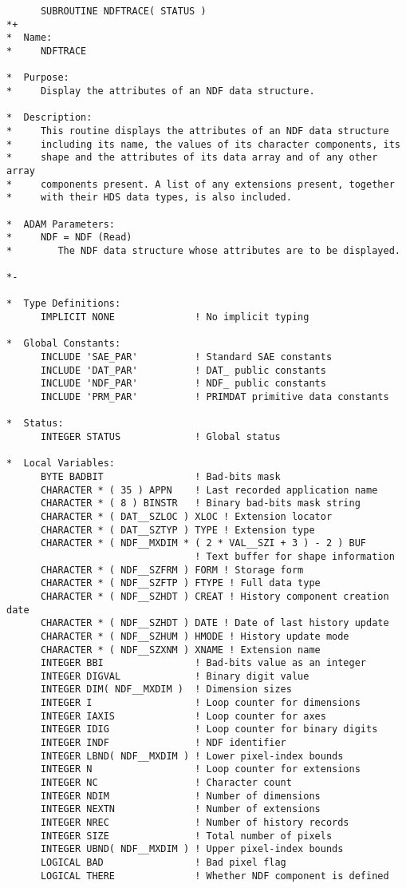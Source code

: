 \documentclass[twoside,11pt]{article}
\begin{document}
\small
\begin{verbatim}
      SUBROUTINE NDFTRACE( STATUS )
*+
*  Name:
*     NDFTRACE

*  Purpose:
*     Display the attributes of an NDF data structure.

*  Description:
*     This routine displays the attributes of an NDF data structure
*     including its name, the values of its character components, its
*     shape and the attributes of its data array and of any other array
*     components present. A list of any extensions present, together
*     with their HDS data types, is also included.

*  ADAM Parameters:
*     NDF = NDF (Read)
*        The NDF data structure whose attributes are to be displayed.

*-
      
*  Type Definitions:
      IMPLICIT NONE              ! No implicit typing

*  Global Constants:
      INCLUDE 'SAE_PAR'          ! Standard SAE constants
      INCLUDE 'DAT_PAR'          ! DAT_ public constants
      INCLUDE 'NDF_PAR'          ! NDF_ public constants
      INCLUDE 'PRM_PAR'          ! PRIMDAT primitive data constants

*  Status:
      INTEGER STATUS             ! Global status

*  Local Variables:
      BYTE BADBIT                ! Bad-bits mask
      CHARACTER * ( 35 ) APPN    ! Last recorded application name
      CHARACTER * ( 8 ) BINSTR   ! Binary bad-bits mask string
      CHARACTER * ( DAT__SZLOC ) XLOC ! Extension locator
      CHARACTER * ( DAT__SZTYP ) TYPE ! Extension type
      CHARACTER * ( NDF__MXDIM * ( 2 * VAL__SZI + 3 ) - 2 ) BUF
                                 ! Text buffer for shape information
      CHARACTER * ( NDF__SZFRM ) FORM ! Storage form
      CHARACTER * ( NDF__SZFTP ) FTYPE ! Full data type
      CHARACTER * ( NDF__SZHDT ) CREAT ! History component creation date
      CHARACTER * ( NDF__SZHDT ) DATE ! Date of last history update
      CHARACTER * ( NDF__SZHUM ) HMODE ! History update mode
      CHARACTER * ( NDF__SZXNM ) XNAME ! Extension name
      INTEGER BBI                ! Bad-bits value as an integer
      INTEGER DIGVAL             ! Binary digit value
      INTEGER DIM( NDF__MXDIM )  ! Dimension sizes
      INTEGER I                  ! Loop counter for dimensions
      INTEGER IAXIS              ! Loop counter for axes
      INTEGER IDIG               ! Loop counter for binary digits
      INTEGER INDF               ! NDF identifier
      INTEGER LBND( NDF__MXDIM ) ! Lower pixel-index bounds
      INTEGER N                  ! Loop counter for extensions
      INTEGER NC                 ! Character count
      INTEGER NDIM               ! Number of dimensions
      INTEGER NEXTN              ! Number of extensions
      INTEGER NREC               ! Number of history records
      INTEGER SIZE               ! Total number of pixels
      INTEGER UBND( NDF__MXDIM ) ! Upper pixel-index bounds
      LOGICAL BAD                ! Bad pixel flag
      LOGICAL THERE              ! Whether NDF component is defined


\end{verbatim}
\end{document}
